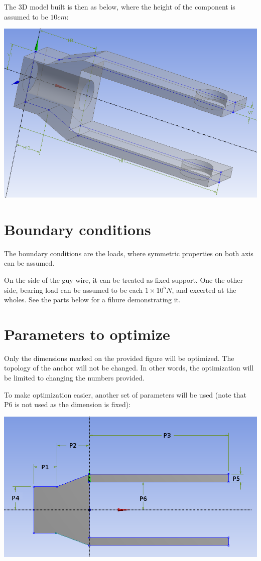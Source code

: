 \documentclass[a4paper,14pt]{extarticle}
\begin{document}
The 3D model built is then as below, where the height of the component is assumed to be $10 cm$:

\includegraphics[width=\textwidth]{3D_S_01.PNG}
\section{Boundary conditions}
The boundary conditions are the loads, where symmetric properties on both axis can be assumed.

On the side of the guy wire, it can be treated as fixed support. One the other side, bearing load can be assumed to be each $1\times10^5 N$, and excerted at the wholes. See the parts below for a fihure demonstrating it.
\section{Parameters to optimize}
Only the dimensions marked on the provided figure will be optimized. The topology of the anchor will not be changed. In other words, the optimization will be limited to changing the numbers provided.

To make optimization easier, another set of parameters will be used (note that P6 is not used as the dimension is fixed):

\includegraphics[width=\textwidth]{singleParam/NEW_DIM.PNG}
\end{document}
